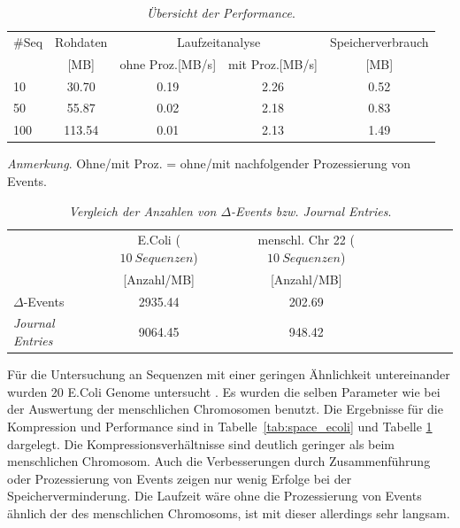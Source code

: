 \documentclass[12pt]{article}
\newenvironment{tightcenter}{%
  \setlength\topsep{0pt}
  \setlength\parskip{0pt}
  \begin{center}
}{%
  \end{center}
}
\begin{document}
\begin{table}[t]
\caption{\label{tab:runtime_ecoli}\emph{Übersicht der Performance}.}
\small
\begin{tightcenter}
\begin{tabular}{lcccc}
	\toprule
	$\#$Seq & Rohdaten & \multicolumn{2}{c}{Laufzeitanalyse} & Speicherverbrauch \\
            & \tiny[MB]& ohne Proz.\tiny[MB/s] & mit Proz.\tiny[MB/s] & \tiny[MB]\\
	\midrule
	10      &  30.70   &     0.19        &      2.26                   &    0.52 \\
	50      &  55.87   &     0.02        &      2.18                   &    0.83 \\
	100     & 113.54   &     0.01        &      2.13                   &    1.49 \\
	\bottomrule
\end{tabular}
\end{tightcenter}
\begin{tablenotes}
	\small \centering
	\item \emph{Anmerkung}. Ohne/mit Proz. = ohne/mit nachfolgender Prozessierung von Events.
\end{tablenotes}
\end{table}

\begin{table}[ht!]
\caption{\label{tab:anzahlen}\emph{Vergleich der Anzahlen von $\Delta$-Events bzw. \textit{Journal Entries}}.}
\small
\begin{tightcenter}
\begin{tabular}{lccccccc}
	\toprule
 	& E.Coli ($10~Sequenzen$) & menschl. Chr 22 ($10~Sequenzen$) \\
 	& [Anzahl/MB] & [Anzahl/MB] & \\
	\midrule
	$\Delta$-Events          & 2935.44 & 202.69\\
	\textit{Journal Entries} & 9064.45 & 948.42\\
	\bottomrule
\end{tabular}
\end{tightcenter}
\end{table}

Für die Untersuchung an Sequenzen mit einer geringen Ähnlichkeit untereinander wurden 20 E.Coli Genome untersucht \cite{DATA:ecoli}. Es wurden die selben Parameter wie bei der Auswertung der menschlichen Chromosomen benutzt. Die Ergebnisse für die Kompression und Performance sind in Tabelle~\ref{tab:space_ecoli} und Tabelle \ref{tab:runtime_ecoli} dargelegt. Die Kompressionsverhältnisse sind deutlich geringer als beim menschlichen Chromosom. Auch die Verbesserungen durch Zusammenführung oder Prozessierung von Events zeigen nur wenig Erfolge bei der Speicherverminderung. Die Laufzeit wäre ohne die Prozessierung von Events ähnlich der des menschlichen Chromosoms, ist mit dieser allerdings sehr langsam. 
\end{document}
